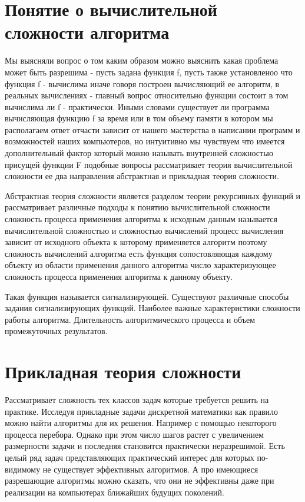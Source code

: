 {\section{Понятие о вычислительной сложности алгоритма}
Мы выясняли вопрос о том каким образом можно выяснить какая проблема может быть разрешима - пусть задана функция f, пусть также установленоо что функция f - вычислима иначе говоря построен вычисляющий ее алгоритм, в реальных вычислениях - главный вопрос относительно функции состоит в том вычислима ли f - практически. Иными словами существует ли программа вычисляющая функцию f за время или в том объему памяти в котором мы располагаем ответ отчасти зависит от нашего мастерства в написании программ и возможностей наших компьютеров, но интуитивно мы чувствуем что имеется дополнительный фактор который можно называть внутренней сложностью присущей функции F подобные вопросы рассматривает теория вычислительной сложности ее два направления абстрактная и прикладная теория сложности.

Абстрактная теория сложности является разделом теории рекурсивных функций и рассматривает различные подходы к понятию вычислительной сложности сложность процесса применения алгоритма к исходным данным называется вычислительной сложностью и сложностью вычислений процесс вычисления зависит от исходного объекта к которому применяется алгоритм поэтому сложность вычислений алгоритма есть функция сопостовляющая каждому объекту из области применения данного алгоритма число характеризующее сложность процесса применения алгоритма к данному объекту.

Такая функция называется сигнализирующей. Существуют различные способы задания сигнализирующих функций.
Наиболее важные характеристики сложности работы алгоритма. Длительность алгоритмического процесса и объем промежуточных результатов. 

\section{Прикладная теория сложности}

Рассматривает сложность тех классов задач которые требуется решить на практике. Исследуя прикладные задачи дискретной математики как правило можно найти алгоритмы для их решения. Например с помощью некоторого процесса перебора. Однако при этом число шагов растет с увеличением размерности задачи и последняя становится практически неразрешимой. Есть целый ряд задач представляющих практический интерес для которых по-видимому не существует эффективных алгоритмов.  А про имеющиеся разрешающие алгоритмы можно сказать, что они не эффективны даже при реализации на компьютерах ближайших будущих поколений.

}

